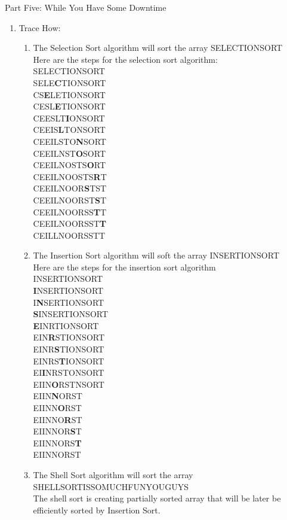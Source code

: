 \documentclass{article}
\begin{document}
\begin{center}
Part Five: While You Have Some Downtime
\end{center}
\begin{enumerate}
\item Trace How:
\begin{enumerate}
\item The Selection Sort algorithm will sort the array SELECTIONSORT\\
Here are the steps for the selection sort algorithm:
\\
SELECTIONSORT\\
SELE\textbf{C}TIONSORT\\
CS\textbf{E}LETIONSORT\\
CESL\textbf{E}TIONSORT\\
CEESLT\textbf{I}ONSORT\\
CEEIS\textbf{L}TONSORT\\
CEEILSTO\textbf{N}SORT\\
CEEILNST\textbf{O}SORT\\
CEEILNOSTS\textbf{O}RT\\
CEEILNOOSTS\textbf{R}T\\
CEEILNOOR\textbf{S}TST\\
CEEILNOORST\textbf{S}T\\
CEEILNOORSS\textbf{T}T\\
CEEILNOORSST\textbf{T}\\
CEILLNOORSSTT\\

\item The Insertion Sort algorithm will soft the array INSERTIONSORT
\\Here are the steps for the insertion sort algorithm
\\
INSERTIONSORT\\
\textbf{I}NSERTIONSORT\\
I\textbf{N}SERTIONSORT\\
\textbf{S}INSERTIONSORT\\
\textbf{E}INRTIONSORT\\
EIN\textbf{R}STIONSORT\\
EINR\textbf{S}TIONSORT\\
EINRS\textbf{T}IONSORT\\
EI\textbf{I}NRSTONSORT\\
EIIN\textbf{O}RSTNSORT\\
EIIN\textbf{N}ORST\\
EIINN\textbf{O}RST\\
EIINNO\textbf{R}ST\\
EIINNOR\textbf{S}T\\
EIINNORS\textbf{T}\\
EIINNORST\\
\item The Shell Sort algorithm will sort the array SHELLSORTISSOMUCHFUNYOUGUYS
\\
The shell sort is creating partially sorted array that will be later be efficiently sorted by Insertion Sort.
\\


\end{enumerate}
\end{enumerate}
\end{document}
